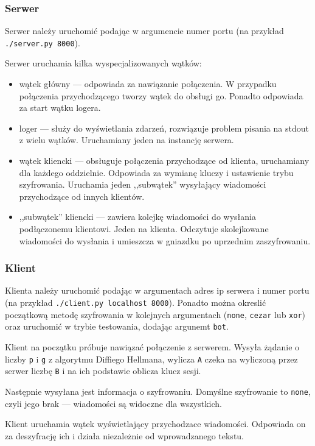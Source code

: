 \documentclass[a4paper]{article}
\begin{document}
\subsubsection{Serwer}
Serwer należy uruchomić podając w argumencie numer portu (na przykład \texttt{./server.py 8000}).

Serwer uruchamia kilka wyspecjalizowanych wątków:
\begin{itemize}
	\item wątek główny --- odpowiada za nawiązanie połączenia. W przypadku połączenia przychodzącego tworzy wątek do obsługi go. Ponadto odpowiada za start wątku logera.
	\item loger --- służy do wyświetlania zdarzeń, rozwiązuje problem pisania na stdout z wielu wątków. Uruchamiany jeden na instancję serwera.
	\item wątek kliencki --- obsługuje połączenia przychodzące od klienta, uruchamiany dla każdego oddzielnie. Odpowiada za wymianę kluczy i ustawienie trybu szyfrowania. Uruchamia jeden ,,subwątek'' wysyłający wiadomości przychodzące od innych klientów.
	\item ,,subwątek'' kliencki --- zawiera kolejkę wiadomości do wysłania podłączonemu klientowi. Jeden na klienta. Odczytuje skolejkowane wiadomości do wysłania i umieszcza w gniazdku po uprzednim zaszyfrowaniu.
\end{itemize}

\subsubsection{Klient}
Klienta należy uruchomić podając w argumentach adres ip serwera i numer portu (na przykład \texttt{./client.py localhost 8000}). Ponadto można okreslić początkową metodę szyfrowania w kolejnych argumentach (\texttt{none}, \texttt{cezar} lub \texttt{xor}) oraz uruchomić w trybie testowania, dodając argunemt \texttt{bot}.

Klient na początku próbuje nawiązać połączenie z serwerem. Wysyła żądanie o liczby \texttt{p} i \texttt{g} z algorytmu Diffiego Hellmana, wylicza \texttt{A} czeka na wyliczoną przez serwer liczbę \texttt{B} i na ich podstawie oblicza klucz sesji.

Następnie wysyłana jest informacja o szyfrowaniu. Domyślne szyfrowanie to \texttt{none}, czyli jego brak --- wiadomości są widoczne dla wszystkich.

Klient uruchamia wątek wyświetlający przychodzace wiadomości. Odpowiada on za deszyfrację ich i działa niezależnie od wprowadzanego tekstu.
\end{document}
